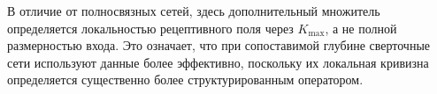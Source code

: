В отличие от полносвязных сетей, здесь дополнительный множитель определяется локальностью рецептивного поля через $K_{\max}$, а не полной размерностью входа. Это означает, что при сопоставимой глубине сверточные сети используют данные более эффективно, поскольку их локальная кривизна определяется существенно более структурированным оператором.




